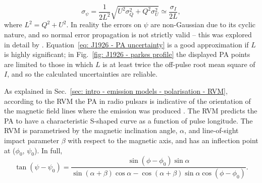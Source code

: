 \begin{equation}
    \label{eq: J1926 - PA uncertainty}
    \sigma_\psi = \frac{1}{2L^2}\sqrt{U^2\sigma_Q^2 + Q^2\sigma_U^2} \simeq \frac{\sigma_I}{2L},
\end{equation}
where $L^2 = Q^2 + U^2$. In reality the errors on $\psi$ are non-Gaussian due to its cyclic nature, and so normal error propagation is not strictly valid -- this was explored in detail by \citet{NCxx1993}. Equation~\eqref{eq: J1926 - PA uncertainty} is a good approximation if $L$ is highly significant; in Fig.~\ref{fig: J1926 - parkes profile} the displayed PA points are limited to those in which $L$ is at least twice the off-pulse root mean square of $I$, and so the calculated uncertainties are reliable.

As explained in Sec.~\ref{sec: intro - emission models - polarisation - RVM}, according to the RVM the PA in radio pulsars is indicative of the orientation of the magnetic field lines where the emission was produced \citep{RCxx1969}. The RVM predicts the PA to have a characteristic S-shaped curve as a function of pulse longitude. The RVM is parametrised by the magnetic inclination angle, $\alpha$, and line-of-sight impact parameter $\beta$ with respect to the magnetic axis, and has an inflection point at ($\phi_0$, $\psi_0$). In full,
\begin{equation}
    \tan(\psi - \psi_0) = \frac{\sin(\phi-\phi_0)\sin\alpha}{\sin(\alpha+\beta)\cos\alpha-\cos(\alpha+\beta)\sin\alpha\cos(\phi-\phi_0)}.
    \label{eq: J1926 - RVM}
\end{equation}

